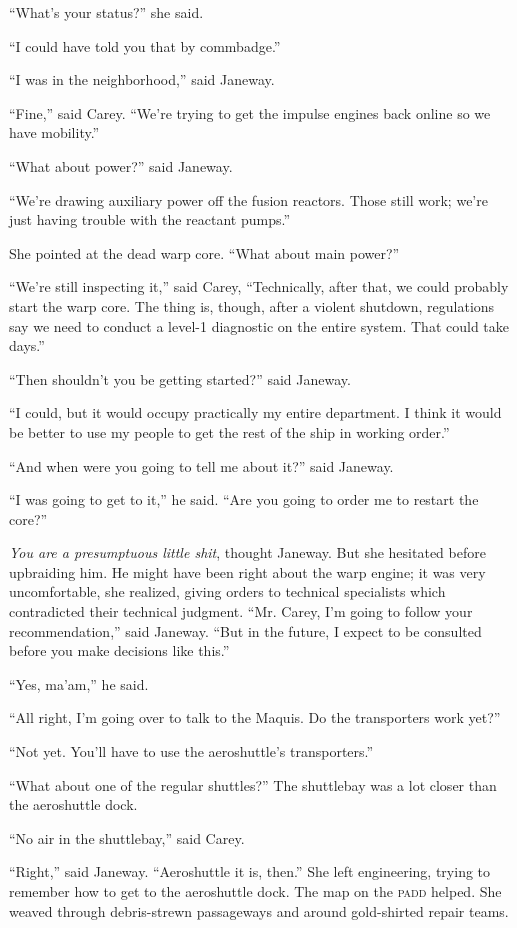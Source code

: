 \documentclass[twoside,letterpaper,12pt]{memoir}
\begin{document}
``What's your status?'' she said.

``I could have told you that by commbadge.''

``I was in the neighborhood,'' said Janeway.

``Fine,'' said Carey. ``We're trying to get the impulse engines back online so we have mobility.''

``What about power?'' said Janeway.

``We're drawing auxiliary power off the fusion reactors. Those still work; we're just having trouble with the reactant pumps.''

She pointed at the dead warp core. ``What about main power?''

``We're still inspecting it,'' said Carey, ``Technically, after that, we could probably start the warp core. The thing is, though, after a violent shutdown, regulations say we need to conduct a level-1 diagnostic on the entire system. That could take days.''

``Then shouldn't you be getting started?'' said Janeway.

``I could, but it would occupy practically my entire department. I think it would be better to use my people to get the rest of the ship in working order.''

``And when were you going to tell me about it?'' said Janeway.

``I was going to get to it,'' he said. ``Are you going to order me to restart the core?''

\textit{You are a presumptuous little shit}, thought Janeway. But she hesitated before upbraiding him. He might have been right about the warp engine; it was very uncomfortable, she realized, giving orders to technical specialists which contradicted their technical judgment. ``Mr. Carey, I'm going to follow your recommendation,'' said Janeway. ``But in the future, I expect to be consulted before you make decisions like this.''

``Yes, ma'am,'' he said.

``All right, I'm going over to talk to the Maquis. Do the transporters work yet?''

``Not yet. You'll have to use the aeroshuttle's transporters.''

``What about one of the regular shuttles?'' The shuttlebay was a lot closer than the aeroshuttle dock.

``No air in the shuttlebay,'' said Carey.

``Right,'' said Janeway. ``Aeroshuttle it is, then.'' She left engineering, trying to remember how to get to the aeroshuttle dock. The map on the \textsc{padd} helped. She weaved through debris-strewn passageways and around gold-shirted repair teams.
\end{document}
